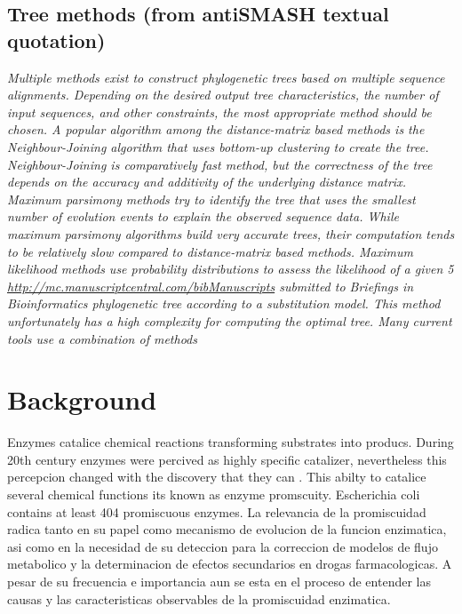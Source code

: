\documentclass[12pt,twoside]{reedthesis}
\begin{document}
  \section{Tree methods (from antiSMASH textual
  quotation)}\label{tree-methods-from-antismash-textual-quotation}
  
  \emph{Multiple methods exist to construct phylogenetic trees based on
  multiple sequence alignments. Depending on the desired output tree
  characteristics, the number of input sequences, and other constraints,
  the most appropriate method should be chosen. A popular algorithm among
  the distance-matrix based methods is the Neighbour-Joining algorithm
  that uses bottom-up clustering to create the tree. Neighbour-Joining is
  comparatively fast method, but the correctness of the tree depends on
  the accuracy and additivity of the underlying distance matrix. Maximum
  parsimony methods try to identify the tree that uses the smallest number
  of evolution events to explain the observed sequence data. While maximum
  parsimony algorithms build very accurate trees, their computation tends
  to be relatively slow compared to distance-matrix based methods. Maximum
  likelihood methods use probability distributions to assess the
  likelihood of a given 5
  \url{http://mc.manuscriptcentral.com/bibManuscripts} submitted to
  Briefings in Bioinformatics phylogenetic tree according to a
  substitution model. This method unfortunately has a high complexity for
  computing the optimal tree. Many current tools use a combination of
  methods}
  
  \chapter*{Background}\label{background}
  
  Enzymes catalice chemical reactions transforming substrates into
  producs. During 20th century enzymes were percived as highly specific
  catalizer, nevertheless this percepcion changed with the discovery that
  they can . This abilty to catalice several chemical functions its known
  as enzyme promscuity. Escherichia coli contains at least 404 promiscuous
  enzymes. La relevancia de la promiscuidad radica tanto en su papel como
  mecanismo de evolucion de la funcion enzimatica, asi como en la
  necesidad de su deteccion para la correccion de modelos de flujo
  metabolico y la determinacion de efectos secundarios en drogas
  farmacologicas. A pesar de su frecuencia e importancia aun se esta en el
  proceso de entender las causas y las caracteristicas observables de la
  promiscuidad enzimatica.
  
\end{document}
